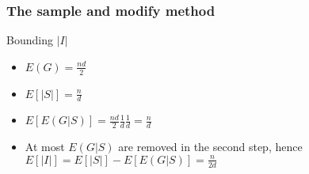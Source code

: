 \documentclass[12pt,aspectratio=169]{beamer}
\begin{document}
\begin{frame}[fragile]
\frametitle{The sample and modify method}
  \begin{block}{Bounding $|I|$}
    \begin{itemize}
    \item
      $E(G) = \frac{nd}{2}$
    \item
      $E[|S|] = \frac{n}{d}$
    \item
      $E[E(G|S)] = \frac{nd}{2}\frac{1}{d}\frac{1}{d} = \frac{n}{d}$
    \item
      At most $E(G|S)$ are removed in the second step, hence $E[|I|] = E[|S|]- E[E(G|S)]= \frac{n}{2d}$
    \end{itemize}
  \end{block}
\end{frame}
\end{document}
